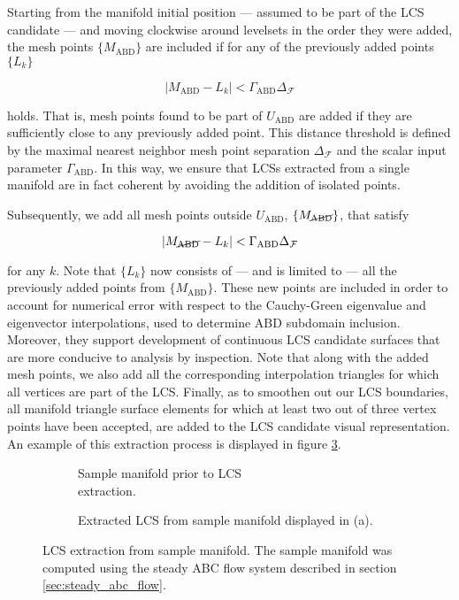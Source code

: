Starting from the manifold initial position --- assumed to be part of the LCS candidate --- and moving clockwise around levelsets in the order they were added, the mesh points $\{M_{\text{ABD}}\}$ are included if for any of the previously added points $\{L_k\}$

\begin{equation}
\left| M_{\text{ABD}} - L_k \right| < \Gamma_{\text{ABD}}\Delta_{\mathcal{F}}
\end{equation}

\noindent holds. That is, mesh points found to be part of $U_{\text{ABD}}$ are added if they are sufficiently close to any previously added point. This distance threshold is defined by the maximal nearest neighbor mesh point separation $\Delta_{\mathcal{F}}$ and the scalar input parameter $\Gamma_{\text{ABD}}$. In this way, we ensure that LCSs extracted from a single manifold are in fact coherent by avoiding the addition of isolated points.

Subsequently, we add all mesh points outside $U_{\text{ABD}}$, $\{M_{\cancel{\text{ABD}}}\}$, that satisfy 

\begin{equation}
\left| M_{\cancel{\text{ABD}}} - L_k \right| < \Gamma_{\text{ABD}}\Delta_{\mathcal{F}}
\end{equation}

\noindent for any $k$. Note that $\{L_k\}$ now consists of --- and is limited to --- all the previously added points from $\{M_{\text{ABD}}\}$. These new points are included in order to account for numerical error with respect to the Cauchy-Green eigenvalue and eigenvector interpolations, used to determine ABD subdomain inclusion. Moreover, they support development of continuous LCS candidate surfaces that are more conducive to analysis by inspection. Note that along with the added mesh points, we also add all the corresponding interpolation triangles for which all vertices are part of the LCS. Finally, as to smoothen out our LCS boundaries, all manifold triangle surface elements for which at least two out of three vertex points have been accepted, are added to the LCS candidate visual representation. An example of this extraction process is displayed in figure \ref{fig:LCS_extraction}.

\begin{figure}[h!]

\centering
\begin{subfigure}[b]{0.45\textwidth}
\centering

\caption{Sample manifold prior to LCS\\ extraction.}\label{fig:LCS_extraction_a}
\end{subfigure}
\begin{subfigure}[b]{0.45\textwidth}
\centering

\caption{Extracted LCS from sample manifold displayed in (a).}\label{fig:LCS_extraction_b}
\end{subfigure}

\caption{LCS extraction from sample manifold. The sample manifold was computed using the steady ABC flow system described in section \ref{sec:steady_abc_flow}.}\label{fig:LCS_extraction} 
\end{figure}

